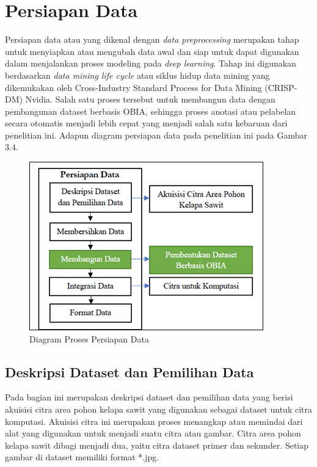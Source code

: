 \section{Persiapan Data}
\hspace{1,2cm}Persiapan data atau yang dikenal dengan \textit{data preprocessing} merupakan tahap untuk menyiapkan atau mengubah data awal dan siap untuk dapat digunakan dalam menjalankan proses modeling pada \textit{deep learning}. Tahap ini digunakan berdasarkan \textit{data mining life cycle} atau siklus hidup data mining yang dikemukakan oleh Cross-Industry Standard Process for Data Mining (CRISP-DM) Nvidia. Salah satu proses tersebut untuk membangun data dengan pembangunan dataset berbasis OBIA, sehingga proses anotasi atau pelabelan secara otomatis menjadi lebih cepat yang menjadi salah satu kebaruan dari penelitian ini. Adapun diagram persiapan data pada penelitian ini pada Gambar 3.4.

\begin{figure}[H]
	\vspace{-0.1cm}
	\begin{center}
		\includegraphics[width=0.6\columnwidth]{bab3/Gambar/Picture4.png}
	\end{center}
	\vspace{-0.2cm}
	\captionsetup{justification=centering}
	\caption{Diagram Proses Persiapan Data}\label{img:Diagram-Proses-Persiapan-Data}
\end{figure}

\subsection{Deskripsi Dataset dan Pemilihan Data}
\hspace{1,2cm}Pada bagian ini merupakan deskripsi dataset dan pemilihan data yang berisi akuisisi citra area pohon kelapa sawit yang digunakan sebagai dataset untuk citra komputasi. Akuisisi citra ini merupakan proses menangkap atau memindai dari alat yang digunakan untuk menjadi suatu citra atau gambar. Citra area pohon kelapa sawit dibagi menjadi dua, yaitu citra dataset primer dan sekunder. Setiap gambar di dataset memiliki format *.jpg.

